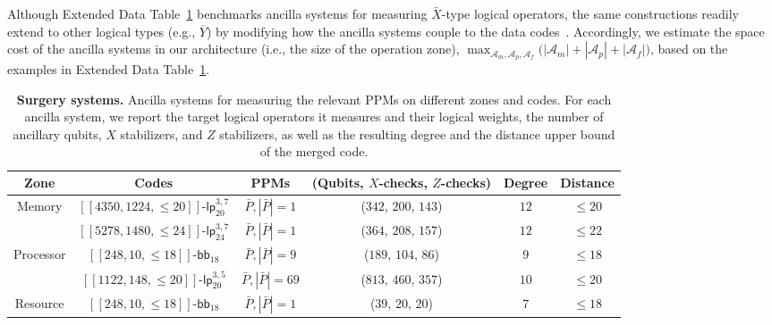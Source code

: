 \documentclass[reprint,twocolumn,secnumarabic,amssymb, aps, prx]{revtex4-2}
\newcommand{\lpmemmedparams}{\mbox{$[[4350, 1224, \leq 20]]$}}
\newcommand{\lpmemlargeparams}{\mbox{$[[5278, 1480, \leq 24]]$}}
\newcommand{\bbparams}{\mbox{$[[248, 10, \leq 18]]$}}
\newcommand{\lpprocparams}{\mbox{$[[1122, 148, \leq 20]]$}}
\newcommand{\lpmemlarge}{\mbox{$\mathsf{lp}_{24}^{3, 7}$}}
\newcommand{\lpmemmed}{\mbox{$\mathsf{lp}^{3, 7}_{20}$}}
\newcommand{\lpproc}{\mbox{$\mathsf{lp}^{3, 5}_{20}$}}
\newcommand{\Aproc}{\mathcal{A}_p}
\newcommand{\Am}{\mathcal{A}_m}
\newcommand{\Af}{\mathcal{A}_f}
\begin{document}
Although Extended Data Table~\ref{tab:surgery} benchmarks ancilla systems for measuring $\bar{X}$-type logical operators, the same constructions readily extend to other logical types (e.g., $\overline{Y}$) by modifying how the ancilla systems couple to the data codes~\cite{he2025extractors}. 
Accordingly, we estimate the space cost of the ancilla systems in our architecture (i.e., the size of the operation zone), $\max_{\Am,\Aproc,\Af} \bigl(|\Am| + |\Aproc| + |\Af|\bigr)$, based on the examples in Extended Data Table~\ref{tab:surgery}.

\begin{table}
    \caption{\textbf{Surgery systems.} Ancilla systems for measuring the relevant PPMs on different zones and codes.
    For each ancilla system, we report the target logical operators it measures and their logical weights, the number of ancillary qubits, $X$ stabilizers, and $Z$ stabilizers, as well as the resulting degree and the distance upper bound of the merged code.
    \label{tab:surgery}
    }
    \centering
    \begin{tabular}{c|c|c|c|c|c}
    \hline
    \hline
    Zone & Codes & PPMs & (Qubits, $X$-checks, $Z$-checks) & Degree & Distance  \\
    \hline
    \multirow{2}{*}{Memory} & 
    $\lpmemmedparams$-$\lpmemmed$ & 
    $\bar{P}, |\bar{P}|=1$ & ($342$, $200$, $143$) & $12$ & $\leq 20$ \\
    & $\lpmemlargeparams$-$\lpmemlarge$ & 
    $\bar{P}, |\bar{P}|=1$ & ($364$, $208$, $157$) & $12$ & $\leq 22$ \\
    \hline
    \multirow{2}{*}{Processor} 
    & $\bbparams$-$\mathsf{bb}_{18}$ & 
    $\bar{P}, |\bar{P}|=9$ & ($189$, $104$, $86$) & $9$ & $\leq 18$ \\
    & $\lpprocparams$-$\lpproc$ & 
    $\bar{P}, |\bar{P}|=69$ & ($813$, $460$, $357$) & $10$ & $\leq 20$ \\
    \hline
    Resource & $\bbparams$-$\mathsf{bb}_{18}$ & 
    $\bar{P}, |\bar{P}|=1$ &  ($39$, $20$, $20$) & $7$ & $\leq 18$ \\
    \hline
    \hline
    \end{tabular}
\end{table}
\end{document}
